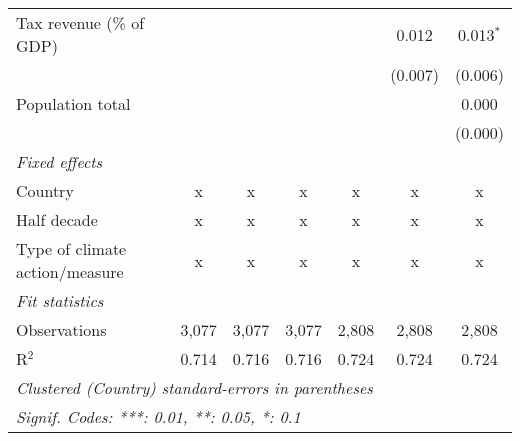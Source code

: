 \begin{tabular}{lcccccc}
   Tax revenue (\% of GDP)                                         &         &                &                &                & 0.012          & 0.013$^{*}$\\   
                                                                   &         &                &                &                & (0.007)        & (0.006)\\   
   Population total                                                &         &                &                &                &                & 0.000\\   
                                                                   &         &                &                &                &                & (0.000)\\   
   \emph{Fixed effects}\\
   Country                                                         & x       & x              & x              & x              & x              & x\\  
   Half decade                                                     & x       & x              & x              & x              & x              & x\\  
   Type of climate action/measure                                  & x       & x              & x              & x              & x              & x\\  
   \midrule \emph{Fit statistics}\\
   Observations                                                    & 3,077   & 3,077          & 3,077          & 2,808          & 2,808          & 2,808\\  
   R$^2$                                                           & 0.714   & 0.716          & 0.716          & 0.724          & 0.724          & 0.724\\  
   \midrule
   \multicolumn{7}{l}{\emph{Clustered (Country) standard-errors in parentheses}}\\
   \multicolumn{7}{l}{\emph{Signif. Codes: ***: 0.01, **: 0.05, *: 0.1}}\\
\end{tabular}
\par\endgroup


